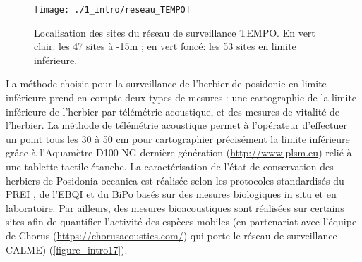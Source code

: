 \begin{figure}[H]
	\begin{center}
	\texttt{[image: ./1\_intro/reseau\_TEMPO]}
		\caption[Localisation des sites du réseau de surveillance TEMPO]{Localisation des sites du réseau de surveillance TEMPO. En vert clair: les 47 sites à -15m ; en vert foncé: les 53 sites en limite inférieure.}
	\label{figure_intro16}
\end{center}
\end{figure}

La méthode choisie pour la surveillance de l’herbier de posidonie en limite inférieure prend en compte deux types de mesures : une cartographie de la limite inférieure de l’herbier par télémétrie acoustique, et des mesures de vitalité de l’herbier. La méthode de télémétrie acoustique permet à l’opérateur d’effectuer un point tous les 30 à 50 cm pour cartographier précisément la limite inférieure grâce à l’Aquamètre D100-NG dernière génération (\href{http://www.plsm.eu}{http://www.plsm.eu}) relié à une tablette tactile étanche. La caractérisation de l’état de conservation des herbiers de Posidonia oceanica est réalisée selon les protocoles standardisés du PREI \citep{gobert_assessment_2009}, de l’EBQI \citep{personnic_ecosystem-based_2014} et du BiPo \citep{lopez_y_royo_biotic_2010} basés sur des mesures biologiques in situ et en laboratoire. Par ailleurs, des mesures bioacoustiques sont réalisées sur certains sites afin de quantifier l’activité des espèces mobiles (en partenariat avec l’équipe de Chorus (\href{https://chorusacoustics.com/}{https://chorusacoustics.com/}) qui porte le réseau de surveillance CALME) (\autoref{figure_intro17}).

\medskip 

\setlength{\fboxsep}{5pt}
\setlength{\fboxrule}{0.6pt}
\noindent{}

